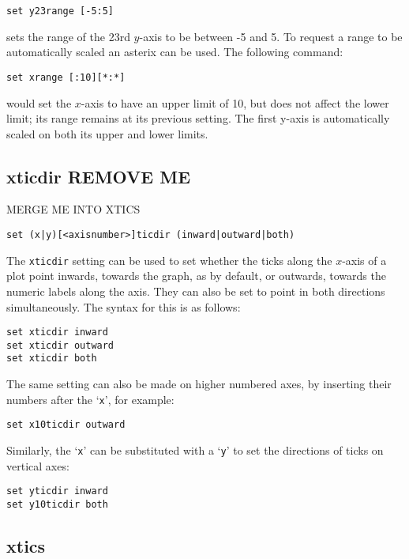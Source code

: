 \begin{verbatim}
set y23range [-5:5]
\end{verbatim}

\noindent sets the range of the 23rd $y$-axis to be between -5 and 5.  To
request a range to be automatically scaled an asterix can be used.  The
following command:

\begin{verbatim}
set xrange [:10][*:*]
\end{verbatim}

\noindent would set the $x$-axis to have an upper limit of 10, but does not
affect the lower limit; its range remains at its previous setting.  The first
y-axis is automatically scaled on both its upper and lower limits.


\subsection{xticdir REMOVE ME}

MERGE ME INTO XTICS

\begin{verbatim}
set (x|y)[<axisnumber>]ticdir (inward|outward|both)
\end{verbatim}

The {\tt xticdir} setting can be used to set whether the ticks along the
$x$-axis of a plot point inwards, towards the graph, as by default, or outwards,
towards the numeric labels along the axis. They can also be set to point in both
directions simultaneously. The syntax for this is as follows:

\begin{verbatim}
set xticdir inward
set xticdir outward
set xticdir both
\end{verbatim}

The same setting can also be made on higher numbered axes, by inserting their
numbers after the `{\tt x}', for example:

\begin{verbatim}
set x10ticdir outward
\end{verbatim}

Similarly, the `{\tt x}' can be substituted with a `{\tt y}' to set the directions of ticks
on vertical axes:

\begin{verbatim}
set yticdir inward
set y10ticdir both
\end{verbatim}


\subsection{xtics}

